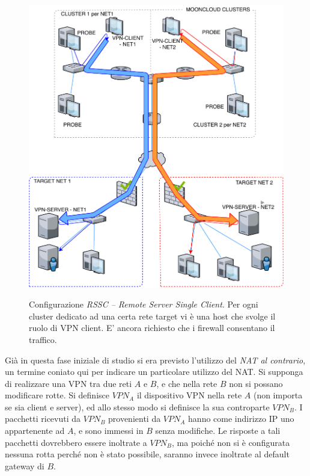 \begin{figure}[h!]
	\includegraphics[scale=0.55]{img/rssc}
	\label{fig:rssc}
	\caption[Configurazione \textit{RSSC -- Remote Server Single Client}]{Configurazione
		\textit{RSSC -- Remote Server Single Client}. Per ogni cluster dedicato ad una certa rete target
		vi è una host che svolge il ruolo di VPN client. E' ancora richiesto che i firewall
	consentano il traffico.}
\end{figure}

Già in questa fase iniziale di studio si era previsto l'utilizzo del \textit{NAT al contrario},
un termine coniato qui per indicare un particolare utilizzo del NAT. 
Si supponga di realizzare una VPN tra due reti $A$ e $B$, e che
nella rete $B$ non si possano modificare rotte. Si definisce $VPN_A$ il dispositivo
VPN nella rete $A$ (non
importa se sia client e server), ed allo stesso modo si definisce la sua controparte $VPN_B$.
I pacchetti ricevuti da $VPN_B$ provenienti da $VPN_A$ hanno come indirizzo IP uno appartenente
ad $A$, e sono immessi in $B$ senza modifiche. Le risposte a tali pacchetti dovrebbero essere inoltrate
a $VPN_B$, ma poiché non si è configurata nessuna rotta perché non è stato possibile, saranno invece
inoltrate al default gateway di $B$.


